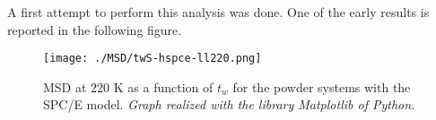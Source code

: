 A first attempt to perform this analysis was done. One of the early results is reported in the following figure.
\begin{figure}[H]
\centering
\begin{minipage}[t]{\textwidth}
	\centering
    \texttt{[image: ./MSD/twS-hspce-ll220.png]}
    
    \footnotesize{\caption{MSD at 220 K as a function of $t_w$ for the powder systems with the SPC/E model. \textit{Graph realized with the library Matplotlib of Python.}}
    \label{fig:wrong-hydr}
    }
\end{minipage} 
\end{figure}



%
%
%
%

